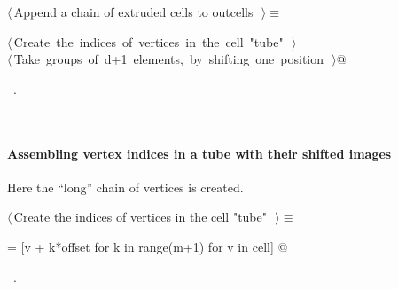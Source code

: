 \documentclass[11pt,oneside]{article}	%
\begin{document}
\begin{flushleft} \small
\begin{minipage}{\linewidth} \label{scrap2}
$\langle\,$Append a chain of extruded cells to outcells\nobreak\ {\footnotesize {}}$\,\rangle\equiv$
\vspace{-1ex}
\begin{list}{}{} \item
\mbox{}\verb@@\hbox{$\langle\,$Create the indices of vertices in the cell "tube"\nobreak\ {\footnotesize {}}$\,\rangle$}\verb@@\\
\mbox{}\verb@@\hbox{$\langle\,$Take groups of d+1 elements, by shifting one position\nobreak\ {\footnotesize {}}$\,\rangle$}\verb@   @\\
\mbox{}\verb@@{\NWsep}
\end{list}
\vspace{-1ex}
\footnotesize\addtolength{\baselineskip}{-1ex}
\begin{list}{}{\setlength{\itemsep}{-\parsep}\setlength{\itemindent}{-\leftmargin}}
\item \NWtxtMacroRefIn\ .
\end{list}
\end{minipage}\\[4ex]
\end{flushleft}

\paragraph{Assembling vertex indices in a tube with their shifted images}
Here the ``long'' chain of vertices is created.
\begin{flushleft} \small
\begin{minipage}{\linewidth} \label{scrap3}
$\langle\,$Create the indices of vertices in the cell "tube"\nobreak\ {\footnotesize {}}$\,\rangle\equiv$
\vspace{-1ex}
\begin{list}{}{} \item
\mbox{}\verb@tube = [v + k*offset for k in range(m+1) for v in cell]  @{\NWsep}
\end{list}
\vspace{-1ex}
\footnotesize\addtolength{\baselineskip}{-1ex}
\begin{list}{}{\setlength{\itemsep}{-\parsep}\setlength{\itemindent}{-\leftmargin}}
\item \NWtxtMacroRefIn\ .
\end{list}
\end{minipage}\\[4ex]
\end{flushleft}
\end{document}

